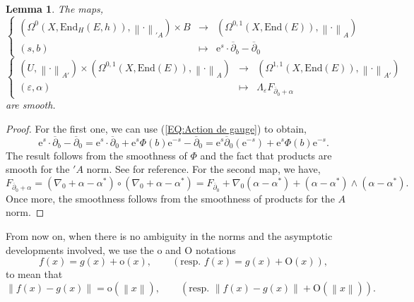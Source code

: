 \documentclass{article}
\newtheorem{lemma}[theorem]{Lemma}
\theoremstyle{remark}
\theoremstyle{definition}
\newcommand{\End}{\mathrm{End}}
\newcommand{\e}{\boldsymbol{\mathrm{e}}}
\newcommand{\norme}[1]{\left\| #1 \right\|}
\newcommand{\dbar}{\overline{\partial}}
\newcommand{\fonction}[4]{\left\{ \begin{array}{rcl}
		\displaystyle #1 & \longrightarrow & \displaystyle #2\\
		\displaystyle #3 & \longmapsto & \displaystyle #4
	\end{array} \right.}
\begin{document}
\begin{lemma}\label{LEM:Applications lisses}
    The maps,
    $$
    \fonction{(\Omega^0(X,\End_H(E,h)),\norme{\cdot}_{{'\!A}}) \times B}{(\Omega^{0,1}(X,\End(E)),\norme{\cdot}_A)}{(s,b)}{\e^s \cdot \dbar_b - \dbar_0}
    $$
    $$
    \fonction{(U,\norme{\cdot}_{A'}) \times (\Omega^{0,1}(X,\End(E)),\norme{\cdot}_A)}{(\Omega^{1,1}(X,\End(E)),\norme{\cdot}_{A'})}{(\varepsilon,\alpha)}{\Lambda_\varepsilon F_{\dbar_0 + \alpha}}
    $$
    are smooth.
\end{lemma}
\begin{proof}
For the first one, we can use (\ref{EQ:Action de gauge}) to obtain,
$$
\e^s \cdot \dbar_b - \dbar_0 = \e^s \cdot \dbar_0 + \e^s\Phi(b)\e^{-s} - \dbar_0 = \e^s\dbar_0(\e^{-s}) + \e^s\Phi(b)\e^{-s}.
$$
The result follows from the smoothness of $\Phi$ and the fact that products are smooth for the ${'\!A}$ norm. See \cite[Theorem 4.12]{Adams_Fournier} for reference. For the second map, we have,
$$
F_{\dbar_0 + \alpha} = (\nabla_0 + \alpha - \alpha^*) \circ (\nabla_0 + \alpha - \alpha^*) = F_{\dbar_0} + \nabla_0(\alpha - \alpha^*) + (\alpha - \alpha^*) \wedge (\alpha - \alpha^*).
$$
Once more, the smoothness follows from the smoothness of products for the $A$ norm.
\end{proof}

From now on, when there is no ambiguity in the norms and the asymptotic developments involved, we use the $\mathrm{o}$ and $\mathrm{O}$ notations
$$
f(x) = g(x) + \mathrm{o}(x), \qquad \left(\textrm{resp. } f(x) = g(x) + \mathrm{O}(x)\right),
$$
to mean that
$$
\norme{f(x) - g(x)} = \mathrm{o}(\norme{x}), \qquad \left(\textrm{resp. } \norme{f(x) - g(x)} + \mathrm{O}(\norme{x})\right).
$$
\end{document}
